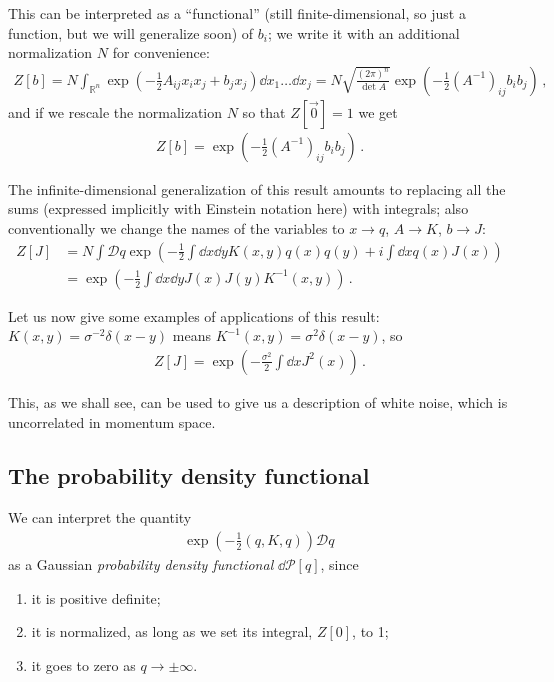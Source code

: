 \documentclass[main.tex]{subfiles}
\begin{document}
This can be interpreted as a ``functional'' (still finite-dimensional, so just a function, but we will generalize soon) of \(b_i\); we write it with an additional normalization \(N\) for convenience:
%
\begin{align}
Z[b] = N \int _{\mathbb{R}^{n}} \exp(- \frac{1}{2} A_{ij} x_i x_j + b_j x_j) \dd{x_1 } \dots \dd{x_j}
= N \sqrt{\frac{(2 \pi )^{n}}{\det A}} \exp(- \frac{1}{2} (A^{-1})_{ij}b_i b_j)
\,,
\end{align}
%
and if we rescale the normalization \(N\) so that \(Z[\vec{0}] = 1 \) we get 
%
\begin{align}
Z[b] = \exp(- \frac{1}{2} (A^{-1})_{ij}b_i b_j)
\,.
\end{align}

The infinite-dimensional generalization of this result amounts to replacing all the sums (expressed implicitly with Einstein notation here) with integrals; also conventionally we change the names of the variables to \(x \to q\), \(A \to K\), \(b \to J\): 
%
\begin{align} \label{eq:gaussian-integral}
Z[J] &= N \int \mathcal{D}q \exp(- \frac{1}{2} \int \dd{x} \dd{y} K(x, y) q(x) q(y) + i \int \dd{x} q(x) J(x))  \\
&= \exp(- \frac{1}{2} \int \dd{x} \dd{y} J(x) J(y) K^{-1}(x, y))
\,.
\end{align}

Let us now give some examples of applications of this result: \(K(x,y) = \sigma^{-2} \delta (x-y)\) means \(K^{-1}(x,y) = \sigma^2 \delta (x-y) \), so 
%
\begin{align}
Z[J] = \exp(- \frac{\sigma^2}{2} \int \dd{x} J^2(x))
\,.
\end{align}

This, as we shall see, can be used to give us a description of white noise, which is uncorrelated in momentum space.

\subsection{The probability density functional}

We can interpret the quantity 
%
\begin{align}
\exp(- \frac{1}{2} (q, K, q)) \mathcal{D}q
\,
\end{align}
%
as a Gaussian \emph{probability density functional} \(\dd{\mathcal{P}}[q]\), since 
\begin{enumerate}
    \item it is positive definite;
    \item it is normalized, as long as we set its integral, \(Z[0]\), to 1;
    \item it goes to zero as \(q \to \pm \infty \).
\end{enumerate}
\end{document}
